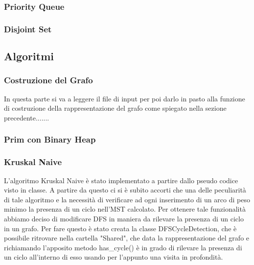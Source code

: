 \subsubsection{Priority Queue}

\subsubsection{Disjoint Set}

\subsection{Algoritmi}

\subsubsection {Costruzione del Grafo}
In questa parte si va a leggere il file di input per poi darlo in pasto alla funzione di costruzione della rappresentazione del grafo come spiegato nella sezione precedente.......

\subsubsection{Prim con Binary Heap}

\subsubsection{Kruskal Naive}
L'algoritmo Kruskal Naive è stato implementato a partire dallo pseudo codice visto in classe. A partire da questo ci si è subito accorti che una delle peculiarità di tale algoritmo e la necessità di verificare ad ogni inserimento di un arco di peso minimo la presenza di un ciclo nell'MST calcolato. Per ottenere tale funzionalità abbiamo deciso di modificare DFS in maniera da rilevare la presenza di un ciclo in un grafo. Per fare questo è stato creata la classe DFSCycleDetection, che è possibile ritrovare nella cartella "Shared", che data la rappresentazione del grafo e richiamando l'apposito metodo has\_cycle() è in grado di rilevare la presenza di un ciclo all'interno di esso usando per l'appunto una visita in profondità.\\

